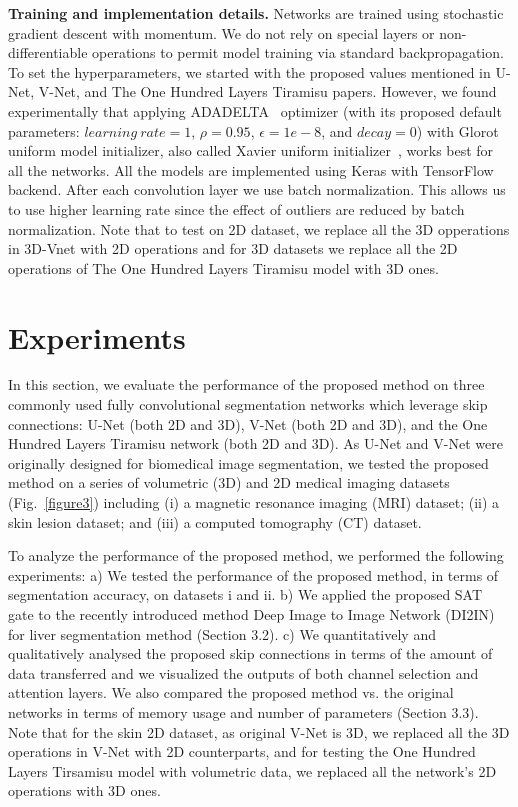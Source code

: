 \documentclass{article}
\begin{document}
\noindent \textbf{Training and implementation details.} Networks are trained using stochastic gradient descent with momentum. We do not rely on special layers or non-differentiable operations to permit model training via standard backpropagation. To set the hyperparameters, we started with the proposed values mentioned in U-Net, V-Net, and The One Hundred Layers Tiramisu papers. However, we found experimentally that applying ADADELTA~\cite{zeiler2012adadelta} optimizer (with its proposed default parameters: $learning \ rate=1$, $\rho=0.95$, $\epsilon=1e-8$, and $decay=0$) with Glorot uniform model initializer, also called Xavier uniform initializer~\cite{glorot2010understanding}, works best for all the networks. All the models are implemented using Keras with TensorFlow backend. After each convolution layer we use batch normalization. This allows us to use higher learning rate since the effect of outliers are reduced by batch normalization. Note that to test on 2D dataset, we replace all the 3D opperations in 3D-Vnet with 2D operations and for 3D datasets we replace all the 2D operations of The One Hundred Layers Tiramisu model with 3D ones.


\section{Experiments}
In this section, we evaluate the performance of the proposed method on three commonly used fully convolutional segmentation networks which leverage skip connections: U-Net (both 2D and 3D), V-Net (both 2D and 3D), and the One Hundred Layers Tiramisu network (both 2D and 3D). As U-Net and V-Net were originally designed for biomedical image segmentation, we tested the proposed method on a series of volumetric (3D) and 2D medical imaging datasets (Fig.~\ref{figure3}) including (i) a magnetic resonance imaging (MRI) dataset; (ii) a skin lesion dataset; and (iii) a computed tomography (CT) dataset.

To analyze the performance of the proposed method, we performed the following experiments: a) We tested the performance of the proposed method, in terms of segmentation accuracy, on datasets i and ii.
b) We applied the proposed SAT gate to the recently introduced method Deep Image to Image Network (DI2IN) ~\cite{yang2017automatic} for liver segmentation method (Section 3.2).
c) We quantitatively and qualitatively analysed the proposed skip connections in terms of the amount of data transferred and we visualized the outputs of both channel selection and attention layers. We also compared the proposed method vs. the original networks in terms of memory usage and number of parameters (Section 3.3). Note that for the skin 2D dataset, as original V-Net is 3D, we replaced all the 3D operations in V-Net with 2D counterparts, and for testing the One Hundred Layers Tirsamisu model with volumetric data, we replaced all the network's 2D operations with 3D ones.
\end{document}
